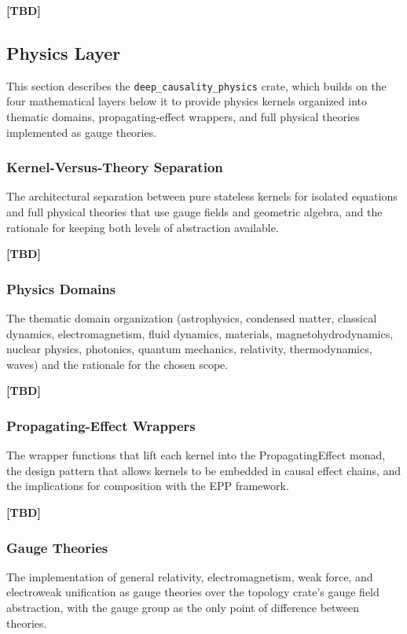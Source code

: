 \textbf{[TBD]}
 
 
\subsection{Physics Layer}
\label{sec:implementation_physics}
 
This section describes the \texttt{deep\_causality\_physics} crate, which builds on the four mathematical layers below it to provide physics kernels organized into thematic domains, propagating-effect wrappers, and full physical theories implemented as gauge theories.
 
\subsubsection{Kernel-Versus-Theory Separation}
The architectural separation between pure stateless kernels for isolated equations and full physical theories that use gauge fields and geometric algebra, and the rationale for keeping both levels of abstraction available.
 
\textbf{[TBD]}
 
\subsubsection{Physics Domains}
The thematic domain organization (astrophysics, condensed matter, classical dynamics, electromagnetism, fluid dynamics, materials, magnetohydrodynamics, nuclear physics, photonics, quantum mechanics, relativity, thermodynamics, waves) and the rationale for the chosen scope.
 
\textbf{[TBD]}
 
\subsubsection{Propagating-Effect Wrappers}
The wrapper functions that lift each kernel into the PropagatingEffect monad, the design pattern that allows kernels to be embedded in causal effect chains, and the implications for composition with the EPP framework.
 
\textbf{[TBD]}
 
\subsubsection{Gauge Theories}
The implementation of general relativity, electromagnetism, weak force, and electroweak unification as gauge theories over the topology crate's gauge field abstraction, with the gauge group as the only point of difference between theories.
 
